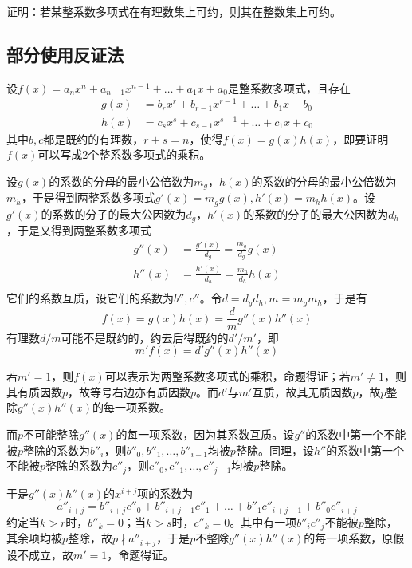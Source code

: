 

证明：若某整系数多项式在有理数集上可约，则其在整数集上可约。

\subsection{部分使用反证法}

设$f(x) = a_nx^n + a_{n - 1}x^{n - 1} + \dots + a_1x + a_0$是整系数多项式，且存在
\begin{align*}
  g(x) &= b_rx^r + b_{r - 1}x^{r - 1} + \dots + b_1x + b_0 \\
  h(x) &= c_sx^s + c_{s - 1}x^{s - 1} + \dots + c_1x + c_0
\end{align*}
其中$b, c$都是既约的有理数，$r + s = n$，使得$f(x) = g(x)h(x)$，即要证明$f(x)$可以写成2个整系数多项式的乘积。

设$g(x)$的系数的分母的最小公倍数为$m_g$，$h(x)$的系数的分母的最小公倍数为$m_h$，于是得到两整系数多项式$g'(x) = m_gg(x), h'(x) = m_hh(x)$。设$g'(x)$的系数的分子的最大公因数为$d_g$，$h'(x)$的系数的分子的最大公因数为$d_h$，于是又得到两整系数多项式
\begin{align*}
  g''(x) &= \frac{g'(x)}{d_g} = \frac{m_g}{d_g}g(x) \\
  h''(x) &= \frac{h'(x)}{d_h} = \frac{m_h}{d_h}h(x) \\
\end{align*}
它们的系数互质，设它们的系数为$b'', c''$。令$d = d_gd_h, m = m_gm_h$，于是有
\[ f(x) = g(x)h(x) = \frac dmg''(x)h''(x) \]
有理数$d/m$可能不是既约的，约去后得既约的$d'/m'$，即
\[ m'f(x) = d'g''(x)h''(x) \]

若$m' = 1$，则$f(x)$可以表示为两整系数多项式的乘积，命题得证；若$m' \ne 1$，则其有质因数$p$，故等号右边亦有质因数$p$。而$d'$与$m'$互质，故其无质因数$p$，故$p$整除$g''(x)h''(x)$的每一项系数。

而$p$不可能整除$g''(x)$的每一项系数，因为其系数互质。设$g''$的系数中第一个不能被$p$整除的系数为$b''_i$，则$b''_0, b''_1, \dots, b''_{i - 1}$均被$p$整除。同理，设$h''$的系数中第一个不能被$p$整除的系数为$c''_j$，则$c''_0, c''_1, \dots, c''_{j - 1}$均被$p$整除。

于是$g''(x)h''(x)$的$x^{i + j}$项的系数为
\[ a''_{i + j} = b''_{i + j}c''_0 + b''_{i + j - 1}c''_1 + \dots + b''_1c''_{i + j - 1} + b''_0c''_{i + j} \]
约定当$k > r$时，$b''_k = 0$；当$k > s$时，$c''_k = 0$。其中有一项$b''_ic''_j$不能被$p$整除，其余项均被$p$整除，故$p \nmid a''_{i + j}$，于是$p$不整除$g''(x)h''(x)$的每一项系数，原假设不成立，故$m' = 1$，命题得证。
